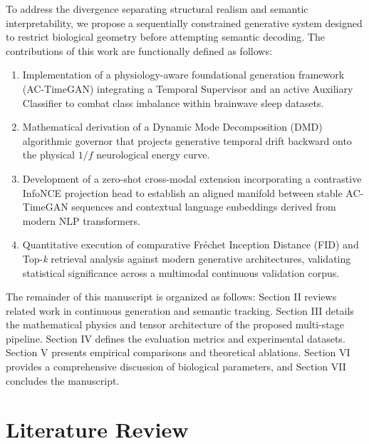 \documentclass[journal]{IEEEtran}
\begin{document}
To address the divergence separating structural realism and semantic interpretability, we propose a sequentially constrained generative system designed to restrict biological geometry before attempting semantic decoding. The contributions of this work are functionally defined as follows:
\begin{enumerate}
    \item Implementation of a physiology-aware foundational generation framework (AC-TimeGAN) integrating a Temporal Supervisor and an active Auxiliary Classifier to combat class imbalance within brainwave sleep datasets.
    \item Mathematical derivation of a Dynamic Mode Decomposition (DMD) algorithmic governor that projects generative temporal drift backward onto the physical $1/f$ neurological energy curve.
    \item Development of a zero-shot cross-modal extension incorporating a contrastive InfoNCE projection head to establish an aligned manifold between stable AC-TimeGAN sequences and contextual language embeddings derived from modern NLP transformers.
    \item Quantitative execution of comparative Fréchet Inception Distance (FID) and Top-\textit{k} retrieval analysis against modern generative architectures, validating statistical significance across a multimodal continuous validation corpus.
\end{enumerate}

The remainder of this manuscript is organized as follows: Section II reviews related work in continuous generation and semantic tracking. Section III details the mathematical physics and tensor architecture of the proposed multi-stage pipeline. Section IV defines the evaluation metrics and experimental datasets. Section V presents empirical comparisons and theoretical ablations. Section VI provides a comprehensive discussion of biological parameters, and Section VII concludes the manuscript.

\section{Literature Review}
\end{document}
